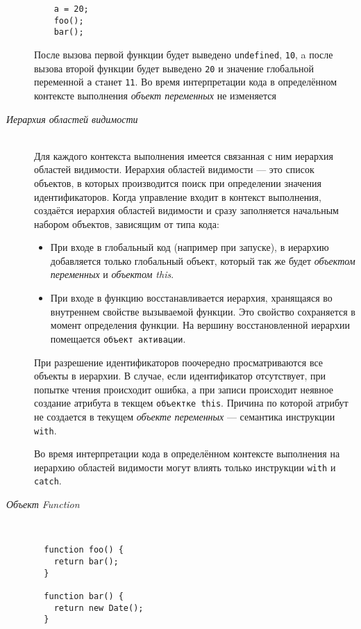 \begin{description}
\begin{lstlisting}
	a = 20;
	foo();
	bar();
      \end{lstlisting}%
      После вызова первой функции будет выведено \texttt{undefined},
      \texttt{10}, a после вызова второй функции будет выведено
      \texttt{20} и значение глобальной переменной \texttt{a} станет
      \texttt{11}. Во время интерпретации кода в определённом
      контексте выполнения \emph{объект переменных} не изменяется
    \item[\emph{Иерархия областей видимости}]~\\  %
      Для каждого контекста выполнения имеется связанная с ним
      иерархия областей видимости. Иерархия областей видимости --- это
      список объектов, в которых производится поиск при определении
      значения идентификаторов. Когда управление входит в контекст
      выполнения, создаётся иерархия областей видимости и сразу
      заполняется начальным набором объектов, зависящим от типа кода:
      \begin{itemize}
	\item При входе в глобальный код (например при запуске), в
	  иерархию добавляется только глобальный объект, который так
	  же будет \emph{объектом переменных} и \emph{объектом this}.
	\item При входе в функцию восстанавливается иерархия, хранящаяся
	  во внутреннем свойстве  вызываемой функции. Это
	  свойство сохраняется в момент определения функции. На вершину
	  восстановленной иерархии помещается \texttt{объект активации}.
      \end{itemize}
      При разрешение идентификаторов поочередно просматриваются все
      объекты в иерархии. В случае, если идентификатор отсутствует,
      при попытке чтения происходит ошибка, а при записи происходит
      неявное создание атрибута в текщем \texttt{объектке this}.
      Причина по которой атрибут не создается в текущем \emph{объекте
      переменных} --- семантика инструкции \texttt{with}.

      Во время интерпретации кода в определённом контексте выполнения
      на иерархию областей видимости могут влиять только инструкции
      \texttt{with} и \texttt{catch}.
    \item[\emph{Объект Function}]~\\  %

\begin{lstlisting}
  function foo() {
    return bar();
  }

  function bar() {
    return new Date();
  }


\end{lstlisting}
\end{description}
